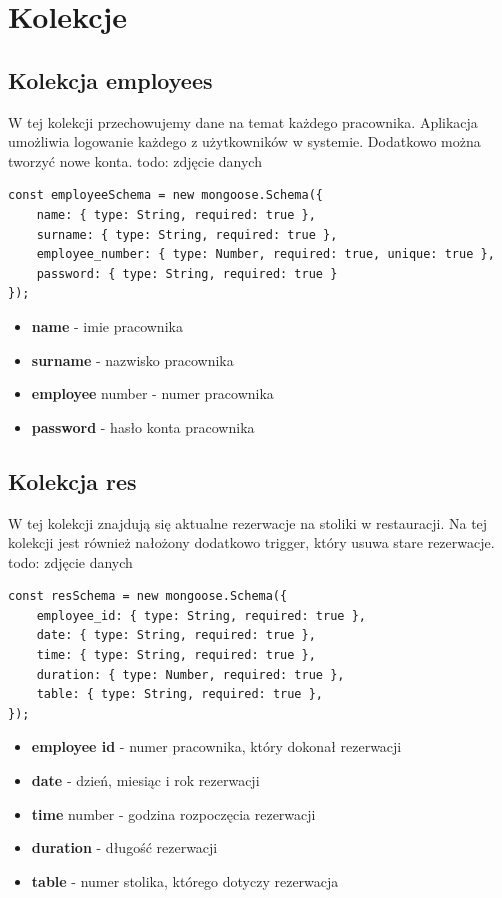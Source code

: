 \documentclass[12pt]{article}
\begin{document}
\section{Kolekcje}
\begin{samepage}
\subsection{Kolekcja employees}
W tej kolekcji przechowujemy dane na temat każdego pracownika. Aplikacja umożliwia logowanie każdego z użytkowników w systemie. Dodatkowo można tworzyć nowe konta.
todo: zdjęcie danych
\begin{lstlisting}[caption={Employees}]
const employeeSchema = new mongoose.Schema({
    name: { type: String, required: true },
    surname: { type: String, required: true },
    employee_number: { type: Number, required: true, unique: true },
    password: { type: String, required: true }
});
\end{lstlisting}
\end{samepage}

\begin{itemize}
	\item \textbf{name} - imie pracownika
	\item \textbf{surname} - nazwisko pracownika
	\item \textbf{employee} number - numer pracownika
	\item \textbf{password} - hasło konta pracownika
\end{itemize}

\newpage
\begin{samepage}
\subsection{Kolekcja res}
W tej kolekcji znajdują się aktualne rezerwacje na stoliki w restauracji. Na tej kolekcji jest również nałożony dodatkowo trigger, który usuwa stare rezerwacje.
todo: zdjęcie danych
\begin{lstlisting}[caption={Reservations}]
const resSchema = new mongoose.Schema({
    employee_id: { type: String, required: true },
    date: { type: String, required: true },
    time: { type: String, required: true },
    duration: { type: Number, required: true },
    table: { type: String, required: true },
});
\end{lstlisting}
\end{samepage}

\begin{itemize}
	\item \textbf{employee id} - numer pracownika, który dokonał rezerwacji
	\item \textbf{date} - dzień, miesiąc i rok rezerwacji
	\item \textbf{time} number - godzina rozpoczęcia rezerwacji
	\item \textbf{duration} - długość rezerwacji
	\item \textbf{table} - numer stolika, którego dotyczy rezerwacja
\end{itemize}
\end{document}
